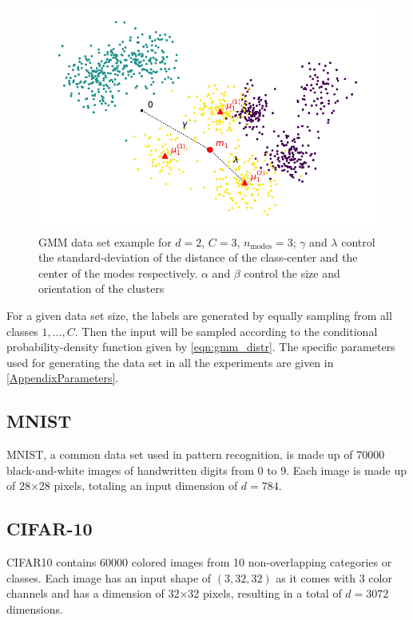 \begin{figure}[h]
    \centering
    \includegraphics{figures/GMM_plot.pdf}
    \caption{GMM data set example for $d=2$, $C=3$, $n_\text{modes}=3$; 
    $\gamma$ and $\lambda$ control the standard-deviation of the distance of the class-center and the center of the modes respectively. $\alpha$ and $\beta$ control the size and orientation of the clusters}
    \label{fig:gmm_plot}
\end{figure}

For a given data set size, the labels are generated by equally sampling from all classes $1, \ldots, C$.
Then the input will be sampled according to the conditional probability-density function given by \cref{eqn:gmm_distr}.
The specific parameters used for generating the data set in all the experiments
are given in \cref{AppendixParameters}.


\subsection{MNIST}
MNIST, a common data set used in pattern recognition, is made up of 70000 black-and-white images 
of handwritten digits from 0 to 9. 
Each image is made up of 28$\times$28 pixels, totaling an input dimension of $d=784$.

\subsection{CIFAR-10}
CIFAR10 contains 60000 colored images from 10 non-overlapping categories or classes.
Each image has an input shape of $(3, 32, 32)$ as it comes with 3 color channels 
and has a dimension of 32$\times$32 pixels, resulting in a total of $d=3072$ dimensions.





